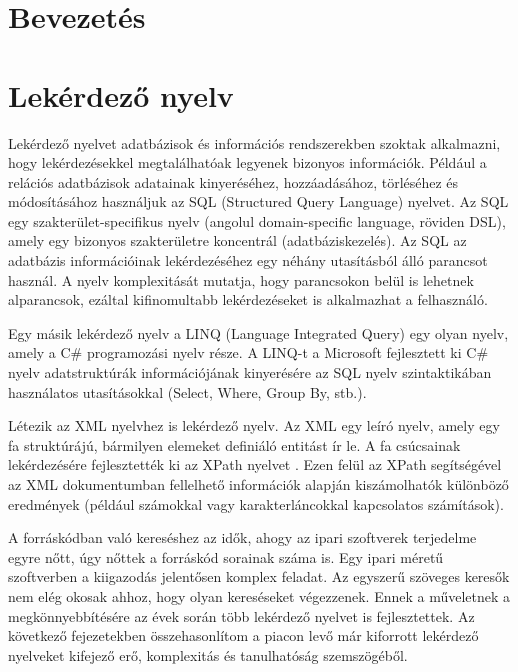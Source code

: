 \documentclass[a4paper,12pt]{report}
\begin{document}
\chapter{Bevezetés}


\chapter{Lekérdező nyelv}
Lekérdező nyelvet adatbázisok és információs rendszerekben szoktak alkalmazni, hogy lekérdezésekkel megtalálhatóak legyenek bizonyos információk.  Például a relációs adatbázisok adatainak kinyeréséhez, hozzáadásához, törléséhez és módosításához használjuk az SQL (Structured Query Language) nyelvet. Az SQL egy szakterület-specifikus nyelv (angolul domain-specific language, röviden DSL), amely egy bizonyos szakterületre koncentrál (adatbáziskezelés). Az SQL az adatbázis információinak lekérdezéséhez egy néhány utasításból álló parancsot használ. A nyelv komplexitását mutatja, hogy parancsokon belül is lehetnek alparancsok, ezáltal kifinomultabb lekérdezéseket is alkalmazhat a felhasználó. 
\par Egy másik lekérdező nyelv a LINQ (Language Integrated Query) egy olyan nyelv, amely a C\# programozási nyelv része. A LINQ-t a Microsoft fejlesztett ki C\# nyelv adatstruktúrák információjának kinyerésére az SQL nyelv szintaktikában használatos utasításokkal (Select, Where, Group By, stb.).
\par Létezik az XML nyelvhez is lekérdező nyelv. Az XML egy leíró nyelv, amely egy fa struktúrájú, bármilyen elemeket definiáló entitást ír le. A fa csúcsainak lekérdezésére fejlesztették ki az XPath nyelvet \cite{xpath}. Ezen felül az XPath segítségével az XML dokumentumban fellelhető információk alapján kiszámolhatók különböző eredmények (például számokkal vagy karakterláncokkal kapcsolatos számítások).
\par A forráskódban való kereséshez az idők, ahogy az ipari szoftverek terjedelme egyre nőtt, úgy nőttek a forráskód sorainak száma is. Egy ipari méretű szoftverben a kiigazodás jelentősen komplex feladat. Az egyszerű szöveges keresők nem elég okosak ahhoz, hogy olyan kereséseket végezzenek. Ennek a műveletnek a megkönnyebbítésére az évek során több lekérdező nyelvet is fejlesztettek. Az következő fejezetekben összehasonlítom a piacon levő már kiforrott lekérdező nyelveket kifejező erő, komplexitás és tanulhatóság szemszögéből.
\end{document}
